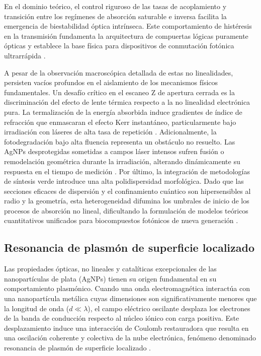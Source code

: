 En el dominio teórico, el control riguroso de las tasas de acoplamiento y
transición entre los regímenes de absorción saturable e inversa facilita la
emergencia de biestabilidad óptica intrínseca. Este comportamiento de
histéresis en la transmisión fundamenta la arquitectura de compuertas lógicas
puramente ópticas y establece la base física para dispositivos de conmutación
fotónica ultrarrápida \cite{mousaviIntrinsicOpticalBistability2025}.

A pesar de la observación macroscópica detallada de estas no linealidades,
persisten vacíos profundos en el aislamiento de los mecanismos físicos
fundamentales. Un desafío crítico en el escaneo Z de apertura cerrada es la
discriminación del efecto de lente térmica respecto a la no linealidad
electrónica pura. La termalización de la energía absorbida induce gradientes
de índice de refracción que enmascaran el efecto Kerr instantáneo,
particularmente bajo irradiación con láseres de alta tasa de repetición
\cite{qayyumNonlinearOpticalProperties2025}.
Adicionalmente, la fotodegradación bajo alta fluencia
representa un obstáculo no resuelto. Las AgNPs desprotegidas sometidas a
campos láser intensos sufren fusión o remodelación geométrica durante la
irradiación, alterando dinámicamente su respuesta en el tiempo de medición
\cite{chevychelovaNonlinearOpticalProperties2021,
gonzalez-campuzanoSaturableAbsorptionNegative2023}.
Por último, la integración de metodologías de síntesis verde introduce una alta
polidispersidad morfológica.  Dado que las secciones eficaces de dispersión y el
confinamiento cuántico son hipersensibles al radio y la geometría, esta
heterogeneidad difumina los umbrales de inicio de los procesos de absorción no
lineal, dificultando la formulación de modelos teóricos cuantitativos unificados
para biocompuestos fotónicos de nueva generación
\cite{josephBiogenicSilverNanoparticles2026,
tchindangounouCorrectionSurfacePlasmon2025}.

\subsection{Resonancia de plasmón de superficie localizado}

Las propiedades ópticas, no lineales y catalíticas excepcionales de las
nanopartículas de plata (AgNPs) tienen su origen fundamental en su
comportamiento plasmónico. Cuando una onda electromagnética interactúa con una
nanopartícula metálica cuyas dimensiones son significativamente menores que la
longitud de onda ($d\ll\lambda$), el campo eléctrico oscilante desplaza los
electrones de la banda de conducción respecto al núcleo iónico con carga
positiva. Este desplazamiento induce una interacción de Coulomb restauradora que
resulta en una oscilación coherente y colectiva de la nube electrónica,
fenómeno denominado resonancia de plasmón de superficie localizado
\cite{thomasPlantbasedSynthesisCharacterization2024,
qayyumNonlinearOpticalProperties2025}.

